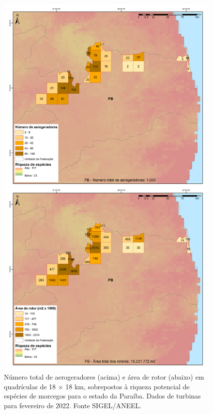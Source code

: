 \documentclass[
  oneside]{scrbook}
\begin{document}
\begin{figure}[H]

{\centering \includegraphics[width=0.75\linewidth]{imagens/cap09/Figura_9.9} 

}

\caption{Número total de aerogeradores (acima) e área de rotor (abaixo) em quadrículas de 18 × 18 km, sobrepostos à riqueza potencial de espécies de morcegos para o estado da Paraíba. Dados de turbinas para fevereiro de 2022. Fonte SIGEL/ANEEL.}\label{fig:74}
\end{figure}
\end{document}
